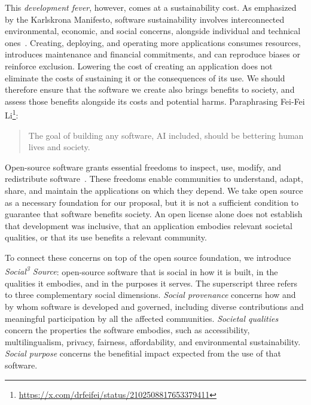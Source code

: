 \documentclass[11pt,a4paper]{article}
\newcommand{\socialsource}{\texorpdfstring{\textit{Social\textsuperscript{3} Source}}{Social3 Source}}
\begin{document}
This \emph{development fever}, however, comes at a sustainability cost.
As emphasized by the Karlskrona Manifesto, software sustainability involves interconnected environmental, economic, and social concerns, alongside individual and technical ones~\cite{Becker2015Sustainability}.
Creating, deploying, and operating more applications consumes resources, introduces maintenance and financial commitments, and can reproduce biases or reinforce exclusion.
Lowering the cost of creating an application does not eliminate the costs of sustaining it or the consequences of its use.
We should therefore ensure that the software we create also brings benefits to society, and assess those benefits alongside its costs and potential harms.
Paraphrasing Fei-Fei Li\footnote{\url{https://x.com/drfeifei/status/2102508817653379411}}:
\begin{quote}
The goal of building any software, AI included, should be bettering human lives and society.
\end{quote}

Open-source software grants essential freedoms to inspect, use, modify, and redistribute software~\cite{R3}.
These freedoms enable communities to understand, adapt, share, and maintain the applications on which they depend.
We take open source as a necessary foundation for our proposal, but it is not a sufficient condition to guarantee that software benefits society.
An open license alone does not establish that development was inclusive, that an application embodies relevant societal qualities, or that its use benefits a relevant community.

To connect these concerns on top of the open source foundation, we introduce \socialsource{}: open-source software that is social in how it is built, in the qualities it embodies, and in the purposes it serves.
The superscript three refers to three complementary social dimensions.
\emph{Social provenance} concerns how and by whom software is developed and governed, including diverse contributions and meaningful participation by all the affected communities.
\emph{Societal qualities} concern the properties the software embodies, such as accessibility, multilingualism, privacy, fairness, affordability, and environmental sustainability.
\emph{Social purpose} concerns the benefitial impact expected from the use of that software.
\end{document}
